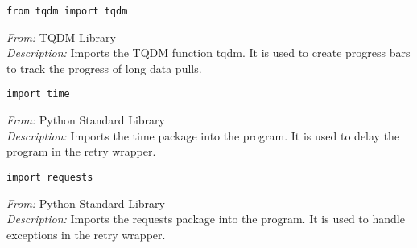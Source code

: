 \documentclass{article}
\begin{document}
\begin{lstlisting}
from tqdm import tqdm
\end{lstlisting}
\textit{From:} TQDM Library\\
\textit{Description:} Imports the TQDM function tqdm. It is used to create progress bars to track the progress of long data pulls.

\begin{lstlisting}
import time
\end{lstlisting}
\textit{From:} Python Standard Library\\
\textit{Description:} Imports the time package into the program. It is used to delay the program in the retry wrapper.

\begin{lstlisting}
import requests
\end{lstlisting}
\textit{From:} Python Standard Library\\
\textit{Description:} Imports the requests package into the program. It is used to handle exceptions in the retry wrapper.
\end{document}
